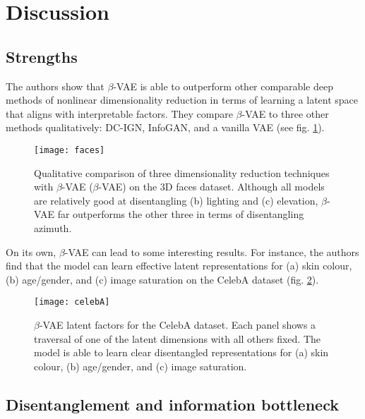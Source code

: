 \section{Discussion}

\subsection{Strengths}

The authors show that $\beta$-VAE is able to outperform other comparable deep methods of nonlinear dimensionality reduction in terms of learning a latent space that aligns with interpretable factors. They compare $\beta$-VAE to three other methods qualitatively: DC-IGN, InfoGAN, and a vanilla VAE (see fig. \ref{faces}).

\begin{figure}
    \texttt{[image: faces]}
    \caption{Qualitative comparison of three dimensionality reduction techniques with $\beta$-VAE ($\beta$-VAE) on the 3D faces dataset. Although all models are relatively good at disentangling (b) lighting and (c) elevation, $\beta$-VAE far outperforms the other three in terms of disentangling azimuth.}
    \label{faces}
\end{figure}

On its own, $\beta$-VAE can lead to some interesting results. For instance, the authors find that the model can learn effective latent representations for (a) skin colour, (b) age/gender, and (c) image saturation on the CelebA dataset (fig. \ref{celebA}).

\begin{figure}
    \texttt{[image: celebA]}
    \caption{$\beta$-VAE latent factors for the CelebA dataset. Each panel shows a traversal of one of the latent dimensions with all others fixed. The model is able to learn clear disentangled representations for (a) skin colour, (b) age/gender, and (c) image saturation.}
    \label{celebA}
\end{figure}

\subsection{Disentanglement and information bottleneck}

